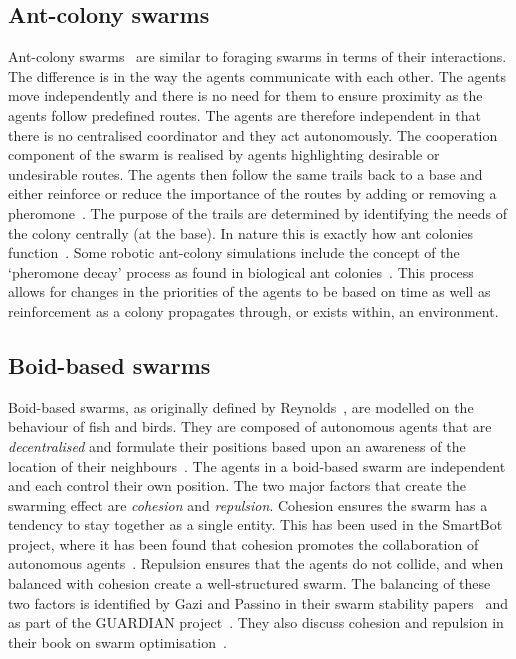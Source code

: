 \subsection{Ant-colony swarms}
Ant-colony swarms~\cite{SWGC:04, MGFND:05, HSSC:10, MVZ:04} are similar to foraging swarms in terms of their interactions. The difference is in the way the agents communicate with each other. The agents move independently and there is no need for them to ensure proximity as the agents follow predefined routes. The agents are therefore independent in that there is no centralised coordinator and they act autonomously. The cooperation component of the swarm is realised by agents highlighting desirable or undesirable routes. The agents then follow the same trails back to a base and either reinforce or reduce the importance of the routes by adding or removing a pheromone~\cite{VBBLO:15}. The purpose of the trails are determined by identifying the needs of the colony centrally (at the base). In nature this is exactly how ant colonies function~\cite{JRD:03}. Some robotic ant-colony simulations include the concept of the `pheromone decay' process as found in biological ant colonies~\cite{RGJHR:08}. This process allows for changes in the priorities of the agents to be based on time as well as reinforcement as a colony propagates through, or exists within, an environment.

\subsection{Boid-based swarms}
Boid-based swarms, as originally defined by Reynolds~\cite{REY:87}, are modelled on the behaviour of fish and birds. They are composed of autonomous agents that are \emph{decentralised} and formulate their positions based upon an awareness of the location of their neighbours~\cite{JMM:08, CHRE:04, HSR:07}. The agents in a boid-based swarm are independent and each control their own position. The two major factors that create the swarming effect are \emph{cohesion} and \emph{repulsion}. Cohesion ensures the swarm has a tendency to stay together as a single entity. This has been used in the SmartBot project, where it has been found that cohesion promotes the collaboration of autonomous agents~\cite{DOR:09, DTGT:04, MFGAB:03}. Repulsion ensures that the agents do not collide, and when balanced with cohesion create a well-structured swarm. The balancing of these two factors is identified by Gazi and Passino in their swarm stability papers~\cite{GP:04, GP:02, GP:04a} and as part of the GUARDIAN project~\cite{SALGVPJ:08}. They also discuss cohesion and repulsion in their book on swarm optimisation~\cite{GP:11}.   

